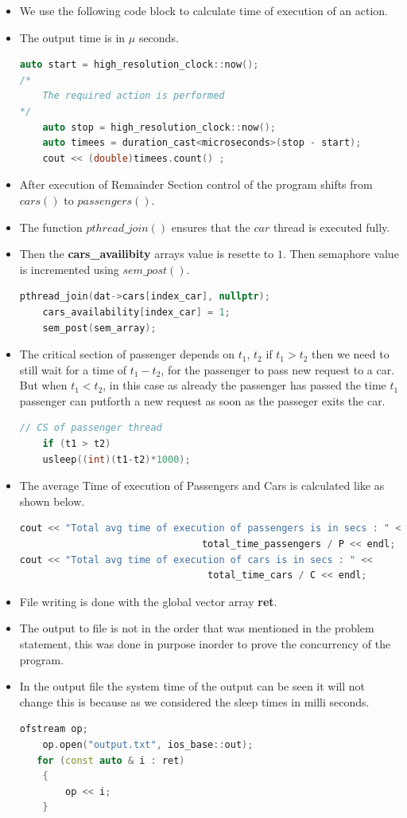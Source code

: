 \documentclass[12pt,a4paper]{article}
\begin{document}
\begin{itemize}
	\item We use the following code block to calculate time of execution of an action.
	\item The output time is in $\mu$ seconds.
			\begin{lstlisting}[language=C++, style = mystyle]
	auto start = high_resolution_clock::now(); 
/*
	The required action is performed 
*/
    auto stop = high_resolution_clock::now(); 
	auto timees = duration_cast<microseconds>(stop - start); 
	cout << (double)timees.count() ; 
\end{lstlisting}
	\item After execution of Remainder Section control of the program shifts from $cars()$ to $passengers()$.
\item The function $pthread\_join()$ ensures that the $car$ thread is executed fully.
\item Then the \textbf{cars\_availibity} arrays value is resette to $1$. Then semaphore value is incremented using $sem\_post()$.
			\begin{lstlisting}[language=C++, style = mystyle]
	pthread_join(dat->cars[index_car], nullptr);
    cars_availability[index_car] = 1;
    sem_post(sem_array); 
\end{lstlisting}
\item The  critical section of passenger depends on $t_1,\, t_2$ if $t_1>t_2$ then we need to still wait for a time of $t_1-t_2$, for the passenger to pass new request to a car. But when $t_1<t_2$, in this case as already the passenger has passed the time $t_1$ passenger can putforth a new request as soon as the passeger exits the car.
			\begin{lstlisting}[language=C++, style = mystyle]
// CS of passenger thread
	if (t1 > t2)
	usleep((int)(t1-t2)*1000);
\end{lstlisting}

\item The average Time of execution of Passengers and Cars is calculated like as shown below.
				\begin{lstlisting}[language=C++, style = mystyle]
cout << "Total avg time of execution of passengers is in secs : " <<
 								total_time_passengers / P << endl;
cout << "Total avg time of execution of cars is in secs : " <<
								 total_time_cars / C << endl;
\end{lstlisting}

\item File writing is done with the global vector array \textbf{ret}.
\item The output to file is not in the order that was mentioned in the problem statement, this was done in purpose inorder to prove the concurrency of the program.
\item In the output file the system time of the output can be seen it will not change this is because as we considered the sleep times in milli seconds.
 				\begin{lstlisting}[language=C++, style = mystyle]
	ofstream op;
	op.open("output.txt", ios_base::out);
   for (const auto & i : ret)
	{	
		op << i;
	}
	\end{lstlisting}
\end{itemize}
\end{document}
